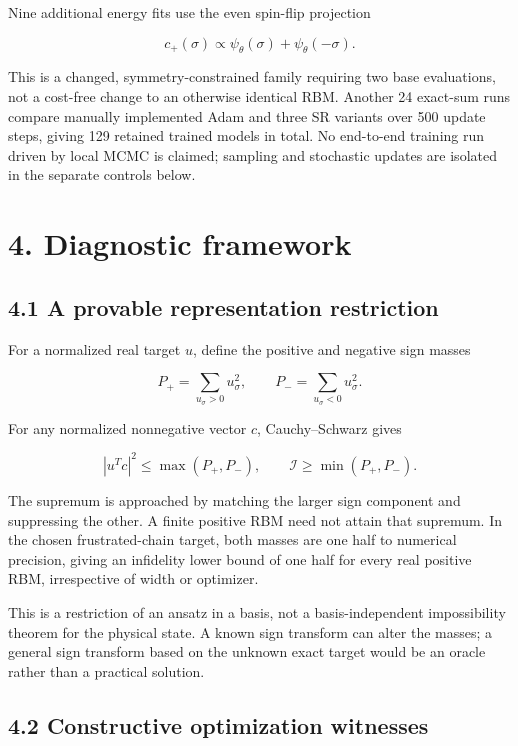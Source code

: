 \documentclass[
  11pt,
  a4paper,
]{article}
\begin{document}
Nine additional energy fits use the even spin-flip projection

\[c_+(\sigma)\propto\psi_\theta(\sigma)+\psi_\theta(-\sigma).\]

This is a changed, symmetry-constrained family requiring two base
evaluations, not a cost-free change to an otherwise identical RBM.
Another 24 exact-sum runs compare manually implemented Adam and three SR
variants over 500 update steps, giving 129 retained trained models in
total. No end-to-end training run driven by local MCMC is claimed;
sampling and stochastic updates are isolated in the separate controls
below.

\hypertarget{diagnostic-framework}{%
\section{4. Diagnostic framework}\label{diagnostic-framework}}

\hypertarget{a-provable-representation-restriction}{%
\subsection{4.1 A provable representation
restriction}\label{a-provable-representation-restriction}}

For a normalized real target \(u\), define the positive and negative
sign masses

\[P_+=\sum_{u_\sigma>0}u_\sigma^2,\qquad P_-=\sum_{u_\sigma<0}u_\sigma^2.\]

For any normalized nonnegative vector \(c\), Cauchy--Schwarz gives

\[|u^Tc|^2\le\max(P_+,P_-),\qquad \mathcal I\ge\min(P_+,P_-).\]

The supremum is approached by matching the larger sign component and
suppressing the other. A finite positive RBM need not attain that
supremum. In the chosen frustrated-chain target, both masses are one
half to numerical precision, giving an infidelity lower bound of one
half for every real positive RBM, irrespective of width or optimizer.

This is a restriction of an ansatz in a basis, not a basis-independent
impossibility theorem for the physical state. A known sign transform can
alter the masses; a general sign transform based on the unknown exact
target would be an oracle rather than a practical solution.

\hypertarget{constructive-optimization-witnesses}{%
\subsection{4.2 Constructive optimization
witnesses}\label{constructive-optimization-witnesses}}
\end{document}
